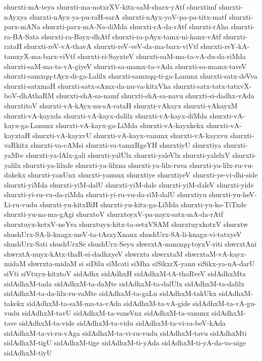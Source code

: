 {shurxti-mA-teya
shurxti-ma-notxrXV-kitx-saM-sharx-yAtf
shurxtimf
shurxti-nAyxya
shurxti-nAyx-ya-pu-raH-sarA
shurxti-nAyx-yoV-pa-pa-titx-matf
shurxti-parx-mANa
shurxti-parx-mA-Na-diMda
shurxti-rA-da-rAtf
shurxti-rAha
shurxti-ra-BA-Sata
shurxti-ra-Bayx-dhAtf
shurxti-ra-pAyx-tamx-ni-hanx-vAtf
shurxti-rataH
shurxti-reV-vA-thavA
shurxti-reV-veV-da-ma-barx-viVtf
shurxti-reY-kA-tamxyX-ma-barx-viVtf
shurxti-ri-SayxteV
shurxti-saM-ma-ta-vA-du-da-riMda
shurxti-saM-ma-ta-vA-giyeV
shurxti-sa-mamx-ta-vAda
shurxti-sa-mamx-taveV
shurxti-samxqq-tAyx-di-ga-Lalilx
shurxti-samxqq-ti-ga-Lanunx
shurxti-satx-deVva
shurxti-satxmaH
shurxti-satx-sAmx-da-nu-va-kitxVha
shurxti-satx-tatx-tatxvX-boV-dhAthaRM
shurxti-shA-sa-namf
shurxti-shA-sa-navu
shurxti-si-dadhx-vAda
shurxtitoV
shurxti-vA-kAyx-nu-sA-rataH
shurxti-vAkayx
shurxti-vAkayxM
shurxti-vA-kayxda
shurxti-vA-kayx-dalilx
shurxti-vA-kayx-diMda
shurxti-vA-kayx-ga-Lanunx
shurxti-vA-kayx-ga-LiMda
shurxti-vA-kayxkekx
shurxti-vA-kayxtaH
shurxti-vA-kayxvU
shurxti-vA-kayx-vanunx
shurxti-vA-kayxvu
shurxti-vaRkitx
shurxti-va-cAMsi
shurxti-va-tamxRgeYH
shurxtiyU
shurxtiya
shurxti-yaMte
shurxti-ya-lAlx-gali
shurxti-yalUlx
shurxti-yaleVlx
shurxti-yalelxV
shurxti-yalilx
shurxti-ya-lilxde
shurxti-ya-lilxna
shurxti-ya-lilx-ruva
shurxti-ya-lilx-ru-vu-dakekx
shurxti-yanUnx
shurxti-yanunx
shurxtiye
shurxtiyeV
shurxti-ye-vi-dhi-side
shurxti-yiMda
shurxti-yiM-dalU
shurxti-yiM-dale
shurxti-yiM-daleV
shurxti-yide
shurxti-yi-ru-vu-da-riMda
shurxti-yi-ru-vu-da-riM-dalU
shurxtiyu
shurxti-yu-heV-Li-ru-vudu
shurxti-yu-kitxBiH
shurxti-yu-kitx-ga-LiMda
shurxti-yu-ko-TiTxde
shurxti-yu-na-ma-gAgi
shurxtoV
shurxtoyxV-pa-nayx-satx-mA-da-rAtf
shurxtuyx-ketxV-neYva
shurxtuyx-kitx-ta-setxVSAM
shurxtuyxkotxV
shurxtw
shushUrx-SA-li-knagx-meV-ta-tAsxyXnanx
shushUrx-SA-li-knagx-vi-tatxyeV
shushUrx-Sati
shushUrxSe
shushUrx-Seyu
shwrxtA-namxqq-toyxV-riti
shwrxtAni
shwrxtA-nuyx-kAtx-thaR-si-dadhxyeV
shwrxta
shwrxtaM
shwrxtaM-vA-kayx-midaM
shwrxta-midaM
si
siDilu
siMcati
siMha
siSikxrX-yanu
siSikx-ya-nA-darU
siVti
siVtuyx-kitxtoV
sidAdhx
sidAdhxH
sidAdhxM-tA-thaRveV
sidAdhxMta
sidAdhxM-tada
sidAdhxM-ta-daMte
sidAdhxM-ta-dalUlx
sidAdhxM-ta-dalilx
sidAdhxM-ta-da-lilx-ru-vaMte
sidAdhxM-ta-gaLu
sidAdhxM-takUkx
sidAdhxM-takekx
sidAdhxM-ta-saM-ma-ta-vAda
sidAdhxM-ta-vA-gide
sidAdhxM-ta-vA-gu-vudu
sidAdhxM-tavU
sidAdhxM-ta-vaneVnx
sidAdhxM-ta-vanunx
sidAdhxM-tave
sidAdhxM-ta-vide
sidAdhxM-ta-vidu
sidAdhxM-ta-vi-ra-beV-kAda
sidAdhxM-ta-vi-ru-vAga
sidAdhxM-ta-vi-ru-vudu
sidAdhxM-tavu
sidAdhxMti
sidAdhxM-tigU
sidAdhxM-tige
sidAdhxM-ti-yAda
sidAdhxM-ti-yA-da-va-nige
sidAdhxM-tiyU
}
